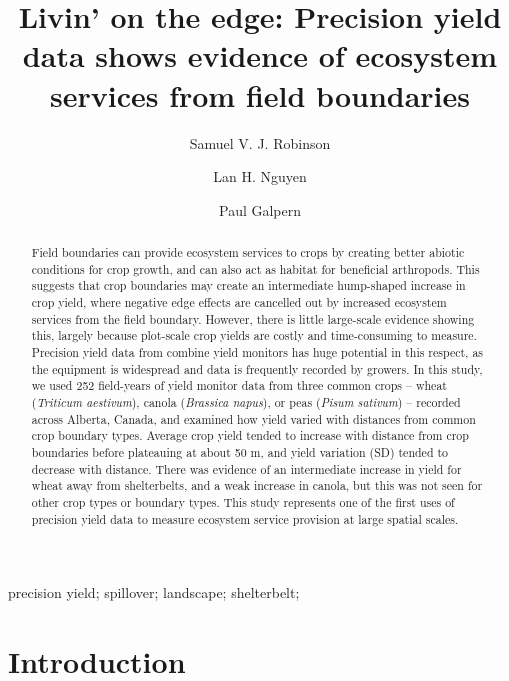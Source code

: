 \documentclass[]{elsarticle} %
\begin{document}
\begin{frontmatter}

  \title{Livin' on the edge: Precision yield data shows evidence of ecosystem services from field boundaries}
    \author[University of Calgary]{Samuel V. J. Robinson}
    \author[University of Calgary]{Lan H. Nguyen}
    \author[University of Calgary]{Paul Galpern}
      \address[University of Calgary]{2500 University Drive NW, Calgary, AB}
  
  \begin{abstract}
  Field boundaries can provide ecosystem services to crops by creating better abiotic conditions for crop growth, and can also act as habitat for beneficial arthropods. This suggests that crop boundaries may create an intermediate hump-shaped increase in crop yield, where negative edge effects are cancelled out by increased ecosystem services from the field boundary. However, there is little large-scale evidence showing this, largely because plot-scale crop yields are costly and time-consuming to measure. Precision yield data from combine yield monitors has huge potential in this respect, as the equipment is widespread and data is frequently recorded by growers. In this study, we used 252 field-years of yield monitor data from three common crops -- wheat (\emph{Triticum aestivum}), canola (\emph{Brassica napus}), or peas (\emph{Pisum sativum}) -- recorded across Alberta, Canada, and examined how yield varied with distances from common crop boundary types. Average crop yield tended to increase with distance from crop boundaries before plateauing at about 50 m, and yield variation (SD) tended to decrease with distance. There was evidence of an intermediate increase in yield for wheat away from shelterbelts, and a weak increase in canola, but this was not seen for other crop types or boundary types. This study represents one of the first uses of precision yield data to measure ecosystem service provision at large spatial scales.
  \end{abstract}
   \begin{keyword} precision yield; spillover; landscape; shelterbelt;\end{keyword}
 \end{frontmatter}

\newpage
\doublespacing

\hypertarget{introduction}{%
\section{Introduction}\label{introduction}}
\end{document}
